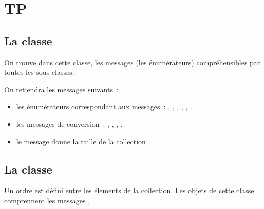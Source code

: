 \section{TP}
\subsection{La classe }
On trouve dans cette classe, les messages (les \'enum\'erateurs) compr\'ehensibles par toutes les sous-classes.

On retiendra les messages suivants~:
\begin{itemize}
\item les \'enum\'erateurs correspondant aux messages~: , , , , , .
\item les messages de conversion~: , , , .
\item le message  donne la taille de la collection

\end{itemize}
\subsection{La classe }
Un ordre est d\'efini entre les \'elements de la collection.  Les objets de cette classe comprennent les messages , .


